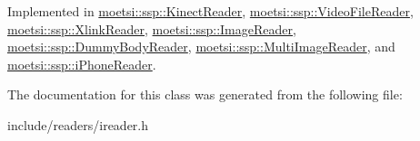 Implemented in \hyperlink{classmoetsi_1_1ssp_1_1KinectReader_a08934b6eff437142e482bb21780ca171}{moetsi\+::ssp\+::\+Kinect\+Reader}, \hyperlink{classmoetsi_1_1ssp_1_1VideoFileReader_ab5733b56b6d6dd7596eac9d914481c7e}{moetsi\+::ssp\+::\+Video\+File\+Reader}, \hyperlink{classmoetsi_1_1ssp_1_1XlinkReader_ab57ff571372fbbe18f4f5f96e4bc7c21}{moetsi\+::ssp\+::\+Xlink\+Reader}, \hyperlink{classmoetsi_1_1ssp_1_1ImageReader_ad8e87720ca0ec97de501f1070119b28d}{moetsi\+::ssp\+::\+Image\+Reader}, \hyperlink{classmoetsi_1_1ssp_1_1DummyBodyReader_ab91b3c2ccdba21bae040340c34361595}{moetsi\+::ssp\+::\+Dummy\+Body\+Reader}, \hyperlink{classmoetsi_1_1ssp_1_1MultiImageReader_a04240c98d28d8949fca4ecdcb04f04f5}{moetsi\+::ssp\+::\+Multi\+Image\+Reader}, and \hyperlink{classmoetsi_1_1ssp_1_1iPhoneReader_a35ca55a03a9fb7b559f9381b11f53bfe}{moetsi\+::ssp\+::i\+Phone\+Reader}.



The documentation for this class was generated from the following file\+:\begin{DoxyCompactItemize}
\item 
include/readers/ireader.\+h\end{DoxyCompactItemize}
